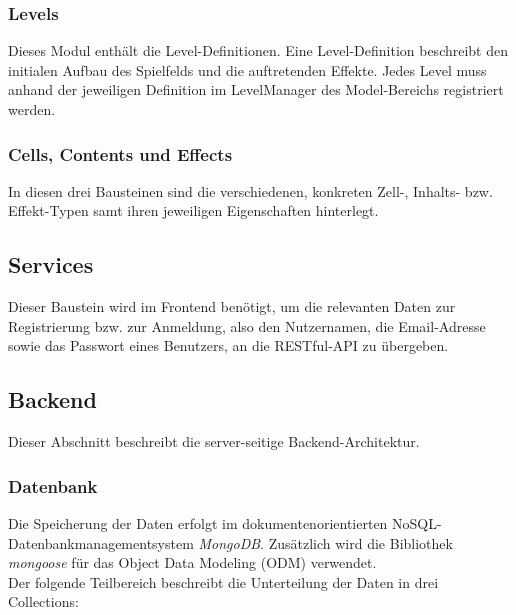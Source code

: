 \documentclass[letterpaper, 10 pt, conference]{ieeeconf}
\begin{document}
\subsubsection{Levels}

Dieses Modul enthält die Level-Definitionen.
Eine Level-Definition beschreibt den initialen Aufbau des Spielfelds und die auftretenden Effekte.
Jedes Level muss anhand der jeweiligen Definition im LevelManager des Model-Bereichs registriert werden.

\subsubsection{Cells, Contents und Effects}

In diesen drei Bausteinen sind die verschiedenen, konkreten Zell-, Inhalts- bzw. Effekt-Typen samt ihren jeweiligen Eigenschaften hinterlegt.

\subsection{Services}

Dieser Baustein wird im Frontend benötigt, um die relevanten Daten zur Registrierung bzw. zur Anmeldung, also den Nutzernamen, die Email-Adresse
sowie das Passwort eines Benutzers, an die RESTful-API zu übergeben.

\subsection{Backend}
Dieser Abschnitt beschreibt die server-seitige Backend-Architektur.

\subsubsection{Datenbank} \label{datenbank}

Die Speicherung der Daten erfolgt im dokumentenorientierten NoSQL-Datenbankmanagementsystem \textit{MongoDB}.
Zusätzlich wird die Bibliothek  \textit{mongoose} für das Object Data Modeling (ODM) verwendet. \\
Der folgende Teilbereich beschreibt die Unterteilung der Daten in drei Collections:
\end{document}
